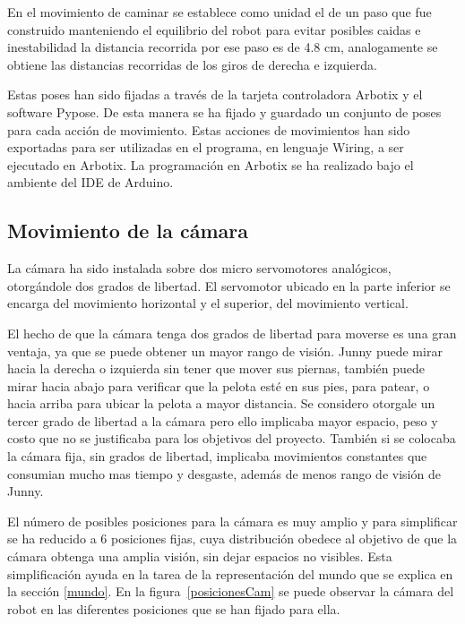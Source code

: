En el movimiento de caminar se establece como unidad el de un paso que fue construido manteniendo el equilibrio del robot para evitar posibles caidas e inestabilidad la distancia recorrida por ese paso es de 4.8 cm, analogamente se obtiene las distancias recorridas de los giros de derecha e izquierda. 

Estas poses han sido fijadas a través de la tarjeta controladora Arbotix y el software Pypose. De esta manera se ha fijado y guardado un conjunto de poses para cada acción de movimiento. Estas acciones de movimientos han sido exportadas para ser utilizadas en el programa, en lenguaje Wiring, a ser ejecutado en Arbotix. La programación en Arbotix se ha realizado bajo el ambiente del IDE de Arduino. 


\subsection{Movimiento de la cámara}\label{movCamara}
La cámara ha sido instalada sobre dos micro servomotores analógicos, otorgándole dos grados de libertad. El servomotor ubicado en la parte inferior se encarga del movimiento horizontal y el superior, del movimiento vertical.

El hecho de  que la cámara tenga dos grados de libertad para moverse es una gran ventaja, ya que se puede obtener un mayor rango de visión. Junny puede mirar hacia la derecha o izquierda sin tener que mover sus piernas, también puede mirar hacia abajo para verificar que la pelota esté en sus pies, para patear, o hacia arriba para ubicar la pelota a mayor distancia.
 Se considero otorgale un tercer grado de libertad a la c\'amara pero ello implicaba mayor espacio, peso y costo que no se justificaba para los objetivos del proyecto. Tambi\'en si se colocaba la c\'amara fija, sin grados de libertad, implicaba movimientos constantes que consumian mucho mas tiempo y desgaste, adem\'as de menos rango de visi\'on de Junny.

El número de posibles posiciones para la cámara es muy amplio y para simplificar se ha reducido a 6 posiciones fijas, cuya distribución obedece al objetivo de que la cámara obtenga una amplia visión, sin dejar espacios no visibles. Esta simplificación ayuda en la tarea de la representación del mundo que se explica en la sección \ref{mundo}. En la figura~\ref{posicionesCam} se puede observar la cámara del robot en las diferentes posiciones que se han fijado para ella.


